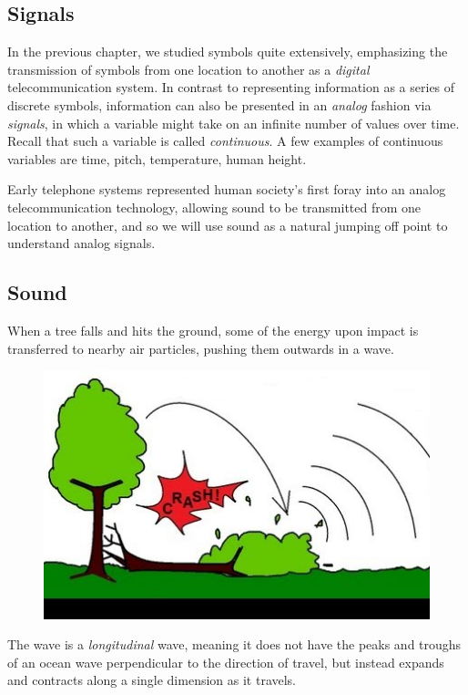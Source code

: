 \documentclass[UTF8]{book}
\begin{document}
\begin{CJK}{UTF8}{gbsn}
\chapter{Signals}

In the previous chapter, we studied symbols quite extensively, emphasizing the transmission of symbols from one location to another as a \emph{digital} telecommunication system. In contrast to representing information as a series of discrete symbols, information can also be presented in an \emph{analog} fashion via \emph{signals}, in which a variable might take on an infinite number of values over time. Recall that such a variable is called \emph{continuous}. A few examples of continuous variables are time, pitch, temperature, human height.

Early telephone systems represented human society's first foray into an analog telecommunication technology, allowing sound to be transmitted from one location to another, and so we will use sound as a natural jumping off point to understand analog signals.

\section{Sound}

When a tree falls and hits the ground, some of the energy upon impact is transferred to nearby air particles, pushing them outwards in a wave.

\begin{figure}[H]
\centering
\includegraphics[width=0.8\linewidth]{treefalling_edited}
\end{figure}

The wave is a \emph{longitudinal} wave, meaning it does not have the peaks and troughs of an ocean wave perpendicular to the direction of travel, but instead expands and contracts along a single dimension as it travels.


\end{CJK}
\end{document}
